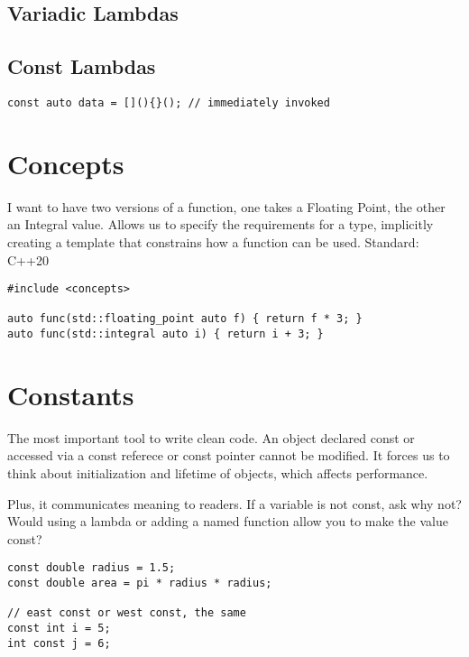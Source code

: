 \subsection{Variadic Lambdas}

\subsection{Const Lambdas}

\begin{verbatim}
const auto data = [](){}(); // immediately invoked
\end{verbatim}

\section{Concepts}

I want to have two versions of a function, one takes a Floating Point, the other an Integral value.
Allows us to specify the requirements for a type, implicitly creating a template
that constrains how a function can be used. Standard: C++20

\begin{verbatim}
#include <concepts>

auto func(std::floating_point auto f) { return f * 3; }
auto func(std::integral auto i) { return i + 3; }
\end{verbatim}

\section{Constants}

The most important tool to write clean code.
An object declared const or accessed via a const referece or const pointer cannot be modified.
It forces us to think about initialization and lifetime of objects, which affects performance. 

Plus, it communicates meaning to readers. 
If a variable is not const, ask why not?
Would using a lambda or adding a named function allow you to make the value const?

\begin{verbatim}
const double radius = 1.5;
const double area = pi * radius * radius;

// east const or west const, the same
const int i = 5;
int const j = 6;
\end{verbatim}

